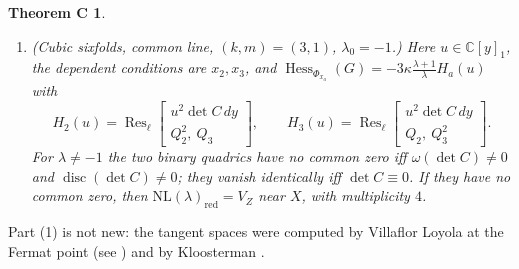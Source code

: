 \documentclass[10pt]{article}
\numberwithin{equation}{section}
\newtheorem*{thmC}{Theorem C}
\theoremstyle{remark}
\newcommand{\CC}{\mathbb{C}}
\newcommand{\NL}{\mathrm{NL}}
\newcommand{\VZ}{V_Z}
\newcommand{\cD}{\mathcal{D}}
\newcommand{\Res}{\operatorname{Res}}
\newcommand{\Hess}{\operatorname{Hess}}
\newcommand{\lres}[2]{\Res_\ell\!\begin{bmatrix} #1 \\ #2 \end{bmatrix}}
\begin{document}
\begin{thmC}
\begin{enumerate}[label=\textup{(\arabic*)}]
Let $\lambda\ne1$. If $\cD\neq0$ at $X$, then $\NL(\lambda)=\{y^2=0\}$ in a smooth germ $M$ of codimension $19$
in which $\VZ=\{y=0\}$. In all cases $\dim\NL(\lambda)=\dim\VZ$: Movasati's Conjecture~1 fails for cubic
eightfolds whenever $r\ne\check r$, at every point of $\VZ$.
\item \textup{(Cubic sixfolds, common line, $(k,m)=(3,1)$, $\lambda_0=-1$.)} Here $u\in\CC[y]_1$, the dependent
conditions are $x_2,x_3$, and $\Hess_{\Phi_{x_a}}(G)=-3\kappa\frac{\lambda+1}{\lambda}H_a(u)$ with
\[
H_2(u)=\lres{u^2\det C\,dy}{Q_2^2,\ Q_3},\qquad H_3(u)=\lres{u^2\det C\,dy}{Q_2,\ Q_3^2}.
\]
For $\lambda\neq-1$ the two binary quadrics have no common zero iff $\omega(\det C)\neq0$ and
$\operatorname{disc}(\det C)\neq0$; they vanish identically iff $\det C\equiv0$. If they have no common zero,
then $\NL(\lambda)_{\mathrm{red}}=\VZ$ near $X$, with multiplicity $4$.
\end{enumerate}
\end{thmC}
Part (1) is not new: the tangent spaces were computed by Villaflor Loyola at the Fermat point (see
\cite[Prop.~5.6]{Mo3}) and by Kloosterman \cite[Theorem~1.3]{Kl1}.
\end{document}
